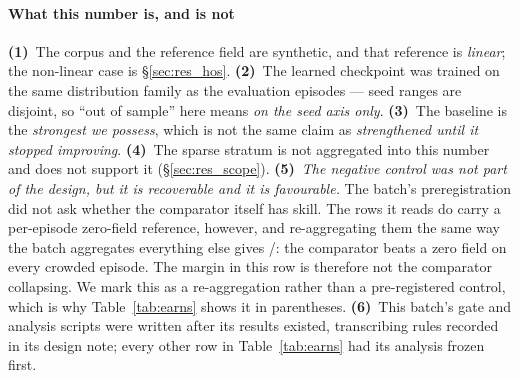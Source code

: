 \documentclass[review]{elsarticle}
\begin{document}
\paragraph{What this number is, and is not}
\textbf{(1)}~The corpus and the reference field are synthetic, and that reference is
\emph{linear}; the non-linear case is \S\ref{sec:res_hos}. \textbf{(2)}~The learned checkpoint was trained on the same
distribution family as the evaluation episodes --- seed ranges are disjoint, so
``out of sample'' here means \emph{on the seed axis only}. \textbf{(3)}~The baseline
is the \emph{strongest we possess}, which is not the same claim as \emph{strengthened
until it stopped improving}. \textbf{(4)}~The sparse stratum is not aggregated into
this number and does not support it (\S\ref{sec:res_scope}).
\textbf{(5)}~\emph{The negative control was not part of the design, but it is
recoverable and it is favourable.} The batch's preregistration did not ask whether
the comparator itself has skill. The rows it reads do carry a per-episode zero-field
reference, however, and re-aggregating them the same way the batch aggregates
everything else gives \BOneCmp{}/\BOneCmpN{}: the comparator beats a zero field on
every crowded episode. The margin in this row is therefore not the comparator
collapsing. We mark this as a re-aggregation rather than a pre-registered control,
which is why Table~\ref{tab:earns} shows it in parentheses.
 \textbf{(6)}~This batch's gate and
analysis scripts were written after its results existed, transcribing rules recorded
in its design note; every other row in Table~\ref{tab:earns} had its analysis frozen
first.
\end{document}
